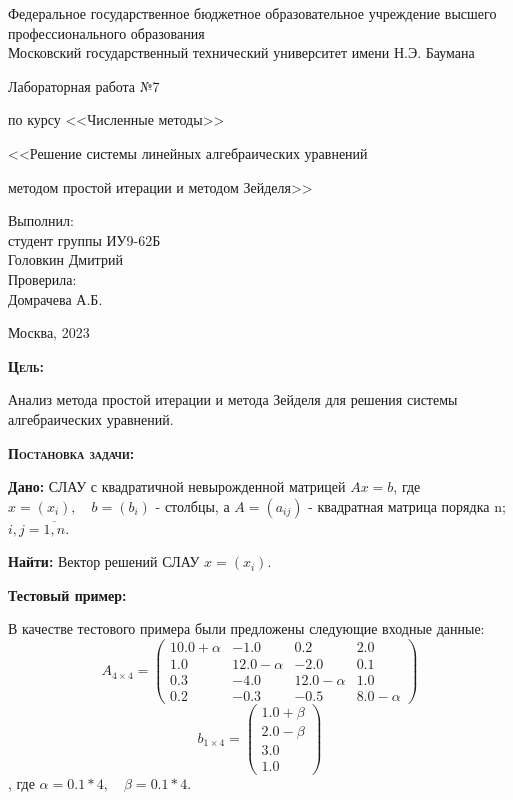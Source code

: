 \documentclass [12pt]{article}
\title{}
\date{}
\author{}
\begin{document}
\begin{titlepage}
\thispagestyle{empty}
\begin{center}
Федеральное государственное бюджетное образовательное учреждение высшего профессионального образования \\Московский государственный технический университет имени Н.Э. Баумана

\end{center}
\vfill
\centerline{\large{Лабораторная работа №7}}
\centerline{\large{по курсу <<Численные методы>>}}
\centerline{\large{<<Решение системы линейных алгебраических уравнений}}
\centerline{\large{методом простой итерации и методом Зейделя>>}}
\vfill
\hfill\parbox{5cm} {
           Выполнил:\\
           студент группы ИУ9-62Б \hfill \\
           Головкин Дмитрий\hfill \medskip\\
           Проверила:\\
           Домрачева А.Б.\hfill
       }
\centerline{Москва, 2023}
\clearpage
\end{titlepage}

\textsc{\textbf{Цель:}} 

Анализ метода простой итерации и метода Зейделя для решения системы алгебраических уравнений.

\textsc{\textbf{Постановка задачи:}} 

\textbf{Дано:}  СЛАУ с квадратичной невырожденной матрицей $Ax = b$, где $x = (x_{i}), \quad b = (b_{i})$ - столбцы, а $A = (a_{ij})$ - квадратная матрица порядка n; $i,j=\overline{1,n}$. 

\textbf{Найти:} Вектор решений СЛАУ $x = (x_{i})$.

\textbf{Тестовый пример:} 

В качестве тестового примера были предложены следующие входные данные: 
\[
    A_{4\times 4} = 
    \begin{pmatrix}
      10.0 + \alpha & -1.0 & 0.2 & 2.0\\
      1.0 & 12.0 - \alpha & -2.0 & 0.1\\
      0.3 & -4.0 & 12.0 - \alpha & 1.0\\
      0.2 & -0.3 & -0.5 & 8.0 - \alpha
    \end{pmatrix}
\]
\[
  b_{1\times 4} = 
  \begin{pmatrix}
    1.0 + \beta \\
    2.0 - \beta \\
    3.0 \\
    1.0 
  \end{pmatrix}
\]
, где $\alpha = 0.1 * 4, \quad \beta = 0.1 * 4$.
\end{document}
